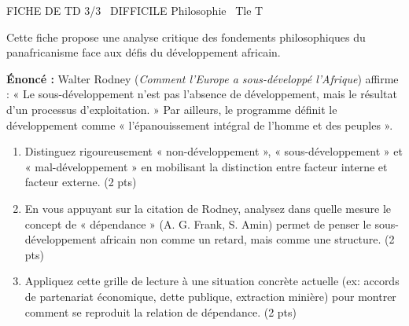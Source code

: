 \documentclass[11pt]{article}
\begin{document}
\begin{tcolorbox}[enhanced,colback=popink,colframe=popink,arc=10pt,boxrule=0pt,left=12pt,right=12pt,top=9pt,bottom=9pt]
{\color{white}\popxbold\small FICHE DE TD 3/3 \textbullet\ DIFFICILE \hfill Philosophie \textbullet\ Tle T\par}
\end{tcolorbox}
\vspace{4pt}
Cette fiche propose une analyse critique des fondements philosophiques du panafricanisme face aux défis du développement africain.

\begin{exercice}
\textbf{Énoncé :} Walter Rodney (\textit{Comment l'Europe a sous-développé l'Afrique}) affirme : « Le sous-développement n'est pas l'absence de développement, mais le résultat d'un processus d'exploitation. » Par ailleurs, le programme définit le développement comme « l'épanouissement intégral de l'homme et des peuples ».
\begin{enumerate}
    \item Distinguez rigoureusement « non-développement », « sous-développement » et « mal-développement » en mobilisant la distinction entre facteur interne et facteur externe. (2 pts)
    \item En vous appuyant sur la citation de Rodney, analysez dans quelle mesure le concept de « dépendance » (A. G. Frank, S. Amin) permet de penser le sous-développement africain non comme un retard, mais comme une structure. (2 pts)
    \item Appliquez cette grille de lecture à une situation concrète actuelle (ex: accords de partenariat économique, dette publique, extraction minière) pour montrer comment se reproduit la relation de dépendance. (2 pts)
\end{enumerate}
\end{exercice}
\end{document}
